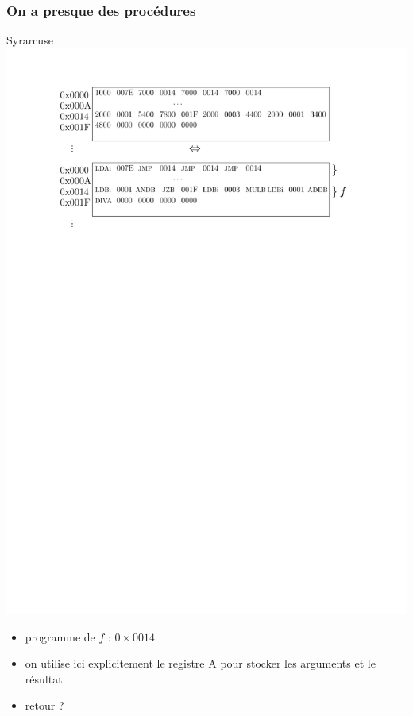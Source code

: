 \documentclass{beamer}
\begin{document}
\begin{frame}
\frametitle{On a presque des procédures}

\begin{block}{Syrarcuse}
\centering\includegraphics[width=0.7\linewidth]{Figs/call_pc.pdf}
\end{block}
\begin{block}{}
\begin{itemize}
\item programme de $f$ : $0\times 0014$
\item on utilise ici explicitement le registre A pour stocker les arguments et le résultat
\item retour ?
\end{itemize}
\end{block}

\end{frame}
\end{document}
